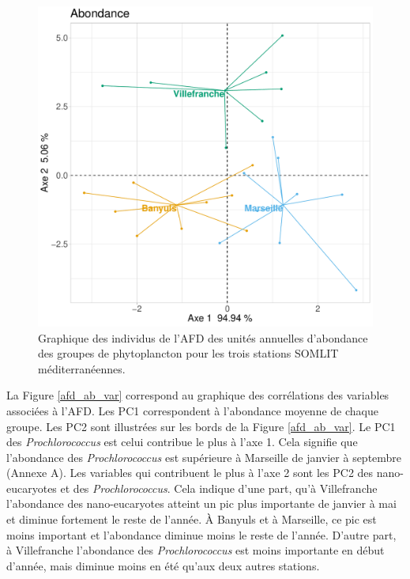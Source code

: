 \documentclass[12pt]{article}
\begin{document}
\begin{figure}
\centering
\includegraphics[width=.65\textwidth]{fig/R221_FDA_ab.pdf}
\caption{Graphique des individus de l'AFD des unités annuelles d'abondance des groupes de phytoplancton pour les trois stations SOMLIT méditerranéennes.}
\label{afd_ab}
\end{figure}

La Figure \ref{afd_ab_var} correspond au graphique des corrélations des variables associées à l’AFD. Les PC1 correspondent à l’abondance moyenne de chaque groupe. Les PC2 sont illustrées sur les bords de la Figure \ref{afd_ab_var}. Le PC1 des \textit{Prochlorococcus} est celui contribue le plus à l’axe 1. Cela signifie que l’abondance des \textit{Prochlorococcus} est supérieure à Marseille de janvier à septembre (Annexe A).  Les variables qui contribuent le plus à l’axe 2 sont les PC2 des nano-eucaryotes et des \textit{Prochlorococcus}. Cela indique d’une part, qu’à Villefranche l’abondance des nano-eucaryotes atteint un pic plus importante de janvier à mai et diminue fortement le reste de l’année. À Banyuls et à Marseille, ce pic est moins important et l’abondance diminue moins le reste de l’année. D’autre part, à Villefranche l’abondance des \textit{Prochlorococcus} est moins importante en début d’année, mais diminue moins en été qu’aux deux autres stations.
\end{document}
